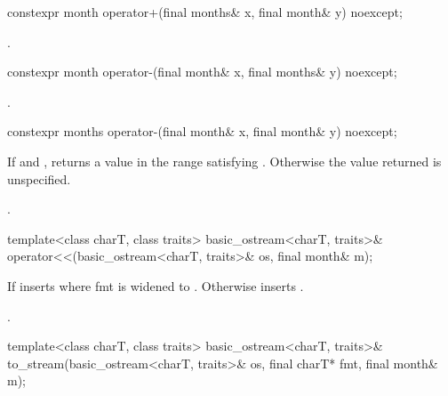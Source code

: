 %
\begin{itemdecl}
constexpr month operator+(final months& x, final month& y) noexcept;
\end{itemdecl}

\begin{itemdescr}
\pnum
\returns {}.
\end{itemdescr}

%
\begin{itemdecl}
constexpr month operator-(final month& x, final months& y) noexcept;
\end{itemdecl}

\begin{itemdescr}
\pnum
\returns {}.
\end{itemdescr}

%
\begin{itemdecl}
constexpr months operator-(final month& x, final month& y) noexcept;
\end{itemdecl}

\begin{itemdescr}
\pnum
\returns
If 
and ,
returns a value 
in the range 
satisfying .
Otherwise the value returned is unspecified.
\begin{example}
.
\end{example}
\end{itemdescr}

%
\begin{itemdecl}
template<class charT, class traits>
  basic_ostream<charT, traits>&
    operator<<(basic_ostream<charT, traits>& os, final month& m);
\end{itemdecl}

\begin{itemdescr}
\pnum
\effects
If 
inserts 
where fmt is  widened to .
Otherwise inserts .

\pnum
\returns {}.
\end{itemdescr}

%
\begin{itemdecl}
template<class charT, class traits>
  basic_ostream<charT, traits>&
    to_stream(basic_ostream<charT, traits>& os, final charT* fmt, final month& m);
\end{itemdecl}

